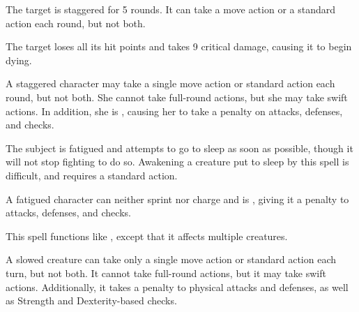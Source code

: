 \begin{spellhealthy}
  The target is staggered for 5 rounds. It can take a move action or a standard action each round, but not both.
\end{spellhealthy}
\begin{spellblood}
  The target loses all its hit points and takes 9 critical damage, causing it to begin dying.
\end{spellblood}
\begin{spellnotes}
 A staggered character may take a single move action or standard action each round, but not both. She cannot take full-round actions, but she may take swift actions. In addition, she is \vulnerable, causing her to take a  penalty on attacks, defenses, and checks.
\end{spellnotes}

\spellrng{\rngmed}
\spelldur{\durshort}
\begin{spelleffect}
  The subject is fatigued and attempts to go to sleep as soon as possible, though it will not stop fighting to do so. Awakening a creature put to sleep by this spell is difficult, and requires a standard action.
\end{spelleffect}
\begin{spellnotes}
    A fatigued character can neither sprint nor charge and is \vulnerable, giving it a  penalty to attacks, defenses, and checks.
\end{spellnotes}

\begin{spelleffect}
  This spell functions like , except that it affects multiple creatures.
\end{spelleffect}

\spellrng{\rngmed}
\spelldur{\durshort}
\begin{spelleffect}
    A slowed creature can take only a single move action or standard action each turn, but not both. It cannot take full-round actions, but it may take swift actions. Additionally, it takes a  penalty to physical attacks and defenses, as well as Strength and Dexterity-based checks.
\end{spelleffect}


